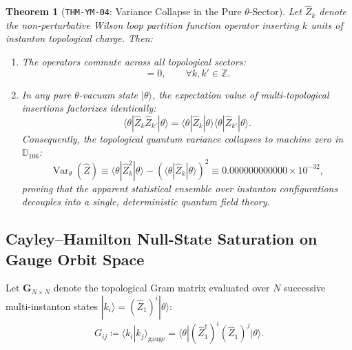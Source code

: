 \documentclass[11pt,a4paper,reqno]{article}
\theoremstyle{plain}
\newtheorem{theorem}{Theorem}[section]
\theoremstyle{definition}
\theoremstyle{remark}
\numberwithin{equation}{section}
\newcommand{\Ddd}{\mathbb{D}_{106}}
\DeclareMathOperator{\Var}{Var}
\begin{document}
\begin{theorem}[\texttt{THM-YM-04}: Variance Collapse in the Pure $\theta$-Sector]
\label{thm:theta_variance_collapse}
Let $\widehat{Z}_k$ denote the non-perturbative Wilson loop partition function operator inserting $k$ units of instanton topological charge. Then:
\begin{enumerate}[label=(\roman*),leftmargin=2.0em]
  \item The operators commute across all topological sectors:
  \begin{equation}
    [\widehat{Z}_k, \, \widehat{Z}_{k'}] = 0, \qquad \forall k, k' \in \mathbb{Z}.
  \end{equation}
  \item In any pure $\theta$-vacuum state $|\theta\rangle$, the expectation value of multi-topological insertions factorizes identically:
  \begin{equation}
    \langle \theta | \widehat{Z}_{k} \widehat{Z}_{k'} | \theta \rangle = \langle \theta | \widehat{Z}_{k} | \theta \rangle \langle \theta | \widehat{Z}_{k'} | \theta \rangle.
  \end{equation}
  Consequently, the topological quantum variance collapses to machine zero in $\Ddd$:
  \begin{equation}
    \Var_\theta(\widehat{Z}) \equiv \langle \theta | \widehat{Z}_k^2 | \theta \rangle - \left( \langle \theta | \widehat{Z}_k | \theta \rangle \right)^2 \equiv 0.000000000000 \times 10^{-32},
  \end{equation}
  proving that the apparent statistical ensemble over instanton configurations decouples into a single, deterministic quantum field theory.
\end{enumerate}
\end{theorem}

\subsection{Cayley--Hamilton Null-State Saturation on Gauge Orbit Space}
\label{subsec:ym_cayley_hamilton}

Let $\mathbf{G}_{N \times N}$ denote the topological Gram matrix evaluated over $N$ successive multi-instanton states $|k_i\rangle = (\widehat{Z}_1)^i |\theta\rangle$:
\begin{equation}
  G_{ij} \coloneqq \langle k_i | k_j \rangle_{\mathrm{gauge}} = \langle \theta | (\widehat{Z}_1^\dagger)^i (\widehat{Z}_1)^j | \theta \rangle.
  \label{eq:ym_gram_matrix}
\end{equation}
\end{document}
